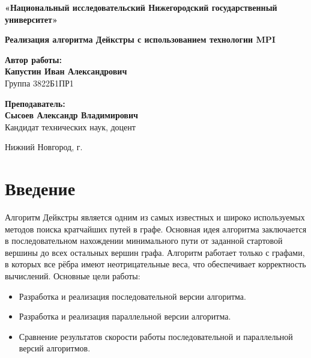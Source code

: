 \documentclass[a4paper,14pt]{extarticle}
\begin{document}
\begin{titlepage}
    \begin{center}
        \vspace*{-1cm} %
        {\large \textbf{«Национальный исследовательский Нижегородский государственный университет»}}
        
        \vspace{4cm} %
        {\LARGE \textbf{Реализация алгоритма Дейкстры с использованием технологии MPI}}
        
        \vspace{3cm} %
        \textbf{Автор работы:}\\
        \vspace{0.5cm}
        \textbf{Капустин Иван Александрович}\\
        Группа 3822Б1ПР1
        
        \vspace{1.5cm}
        \textbf{Преподаватель:}\\
        \vspace{0.5cm}
        \textbf{Сысоев Александр Владимирович}\\
        Кандидат технических наук, доцент
        
        \vfill %
        Нижний Новгород, \the\year{} г.
    \end{center}
\end{titlepage}

\section*{Введение}

Алгоритм Дейкстры является одним из самых известных и широко используемых методов поиска кратчайших путей в графе. Основная идея алгоритма заключается в последовательном нахождении минимального пути от заданной стартовой вершины до всех остальных вершин графа. Алгоритм работает только с графами, в которых все рёбра имеют неотрицательные веса, что обеспечивает корректность вычислений.
Основные цели работы:
\begin{itemize}
    \item Разработка и реализация последовательной версии алгоритма.
    \item Разработка и реализация параллельной версии алгоритма.
    \item Сравнение результатов скорости работы последовательной и параллельной версий алгоритмов.
\end{itemize}
\end{document}
